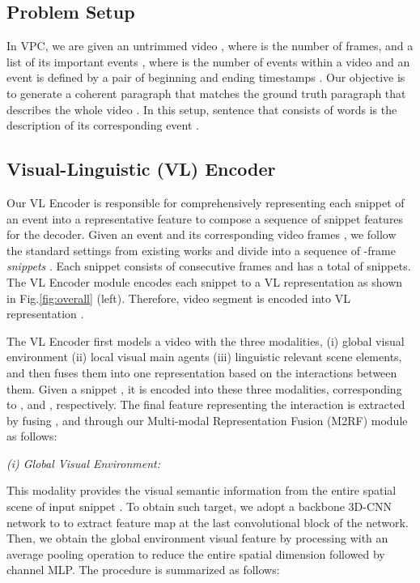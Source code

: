 \documentclass[letterpaper]{article} \usepackage{aaai23}  \usepackage{times}  \usepackage{helvet}  \usepackage{courier}  \usepackage[hyphens]{url}  \usepackage{graphicx} \urlstyle{rm} \def\UrlFont{\rm}  \usepackage{natbib}  \usepackage{caption} \frenchspacing  \setlength{\pdfpagewidth}{8.5in}  \setlength{\pdfpageheight}{11in}  \usepackage{algorithm}
\newcommand{\encoder}{VL Encoder\xspace}
\begin{document}
\subsection{Problem Setup}
\label{sec:setup}
In VPC, we are given an untrimmed video , where  is the number of frames, and a list of its important events , where  is the number of events within a video and an event  is defined by a pair of beginning and ending timestamps . Our objective is to generate a coherent paragraph that matches the ground truth paragraph  that describes the whole video . In this setup,  sentence  that consists of  words is the description of its corresponding event .










\subsection{Visual-Linguistic (VL) Encoder}
\label{sec:vl_encode}
Our \encoder is responsible for comprehensively representing each snippet  of an event into a representative feature to compose a sequence of snippet features for the decoder.
Given an event  and its corresponding video frames , we follow the standard settings from existing works \cite{zhou2018end, lei2020mart, Song2021} and divide  into a sequence of -frame \textit{snippets} . Each snippet  consists of  consecutive frames and  has a total of  snippets. The \encoder module encodes each snippet  to a VL representation  as shown in Fig.\ref{fig:overall} (left). Therefore, video segment  is encoded into VL representation  . 




The \encoder first models a video with the three modalities, (i) global visual environment (ii) local visual main agents (iii) linguistic relevant scene elements, and then fuses them into one representation based on the interactions between them. Given a snippet , it is encoded into these three modalities, corresponding to ,  and , respectively. The final feature  representing the interaction is extracted by fusing ,  and  through our Multi-modal Representation Fusion (M2RF) module as follows:





\noindent
\textit{(i) Global Visual Environment:}

This modality provides the visual semantic information from the entire spatial scene of input snippet . To obtain such target, we adopt a backbone 3D-CNN network \cite{C3D} to  to extract feature map  at the last convolutional block of the network. Then, we obtain the global environment visual feature  by processing  with an average pooling operation to reduce the entire spatial dimension followed by channel MLP. The procedure is summarized as follows:
\end{document}
